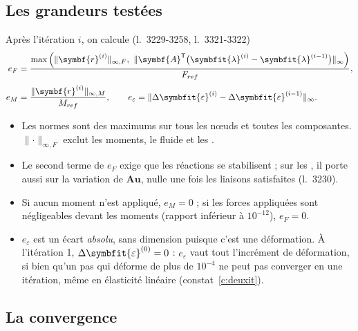 \documentclass[11pt,a4paper]{article}
\numberwithin{equation}{section}
\newcommand{\src}[1]{\texttt{\detokenize{#1}}}          %
\newcommand{\lig}[1]{l.~#1}
\newcommand{\vc}[1]{\symbf{#1}}                         %
\newcommand{\eps}{\varepsilon}
\newcommand{\Deps}{\Delta\symbfit{\varepsilon}}
\newcommand{\vg}[1]{\symbfit{#1}}                       %
\newcommand{\norminf}[1]{\lVert #1\rVert_{\infty}}
\begin{document}
\subsection{Les grandeurs testées}

Après l'itération $i$, on calcule (\lig{3229-3258}, \lig{3321-3322})
\begin{align}
e_F &= \frac{\max\Big(\lVert \vc r^{(i)}\rVert_{\infty,F},\ \norminf{\vc A^{\mathsf T}\big(\vg\lambda^{(i)} - \vg\lambda^{(i-1)}\big)}\Big)}{F_{ref}},\\[2pt]
e_M &= \frac{\lVert \vc r^{(i)}\rVert_{\infty,M}}{M_{ref}},\qquad
e_\eps = \norminf{\Deps^{(i)} - \Deps^{(i-1)}} .
\end{align}
\begin{itemize}
\item Les normes sont des maximums sur tous les nœuds et toutes les composantes. $\lVert \cdot\rVert_{\infty,F}$ exclut les moments, le fluide et les \src{FLX}.
\item Le second terme de $e_F$ exige que les réactions se stabilisent ; sur les \src{FLX}, il porte aussi sur la variation de $\vc A\vc u$, nulle une fois les liaisons satisfaites (\lig{3230}).
\item Si aucun moment n'est appliqué, $e_M = 0$ ; si les forces appliquées sont négligeables devant les moments (rapport inférieur à $10^{-12}$), $e_F = 0$.
\item $e_\eps$ est un écart \emph{absolu}, sans dimension puisque c'est une déformation. À l'itération 1, $\Deps^{(0)} = 0$ : $e_\eps$ vaut tout l'incrément de déformation, si bien qu'un pas qui déforme de plus de $10^{-4}$ ne peut pas converger en une itération, même en élasticité linéaire (constat~\ref{c:deuxit}).
\end{itemize}

\subsection{La convergence}
\end{document}
